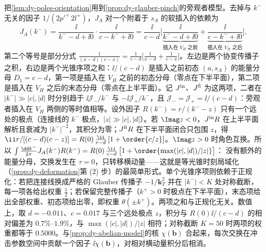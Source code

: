 \begin{example}[旁观者模型的光锥序表示]\label{ex:dy-spectator-lcopt}
把\cref{lem:dy-poles-orientation}用到\cref{prop:dy-glauber-pinch}的旁观者模型。去掉与 $k^-$ 无关的因子 $1/(2p'^+\,2l^+)$，$J_A$ 对一个附着于 $s_A$ 的软插入的依赖为
\begin{equation}\label{eq:dy-JA-two-orderings}
J_A(k^-)=\frac{\ii}{k^--d+\ii0}\cdot\frac{\ii}{c-k^-+\ii0}
=\frac{\ii}{c-d}\Big[\underbrace{\frac{\ii}{k^--d+\ii0}}_{\text{插入在 }V_H\text{ 之前}}+\underbrace{\frac{\ii}{c-k^-+\ii0}}_{\text{插入在 }V_H\text{ 之后}}\Big],
\end{equation}
第二个等号是部分分式 $\frac{1}{(x-d)(c-x)}=\frac{1}{c-d}\big[\frac{1}{x-d}+\frac{1}{c-x}\big]$。左边是两个协变传播子之积，右边是两个光锥序项之和：$\ii/(c-d)$ 是插入之前初态 $(a,s_A)$ 的能量分母 $D_1=c-d$，第一项是插入在 $V_H$ 之前的初态分母（零点在下半平面），第二项是插入在 $V_H$ 之后的末态分母（零点在上半平面）。记 $J^{\rm in}$、$J^{\rm fi}$ 为这两项，二者在 $|k^-|\gg|c|,|d|$ 时分别趋于 $\ii\mathcal J_-/k^-$ 与 $-\ii\mathcal J_+/k^-$，且 $\mathcal J_-=\mathcal J_+=\ii/(c-d)$：旁观者插入在 $V_H$ 两侧的等时值相等。设外因子 $R(k^-)=r/(k^--z)$ 只有一个远处的极点（连接线的 $k^-$ 极点，$|z|\gg|c|,|d|$）。若 $\Imag z<0$，$J^{\rm in}R$ 在上半平面解析且衰减为 $|k^-|^{-2}$，其积分为零；$J^{\rm fi}R$ 在下半平面闭合只包围 $z$，得 $\ii r/[(c-d)(c-z)]=R(0)\,\frac{\ii}{c-d}\,[1+\order{c/z}]$。$\Imag z>0$ 时角色互换。所以
$\int\frac{\dd k^-}{2\pi}J_A(k^-)R(k^-)=R(0)\,\frac{\ii}{c-d}\,\big[1+\order{\max(|c|,|d|)/|z|}\big]$：
没有额外的能量分母，交换发生在 $\tau=0$，只转移横动量——这就是等光锥时刻局域化（\cref{prop:dy-deformation}第 (2) 步）的最简单形式。单个光锥序项则依赖于正规化：若把连接线换成严格的 Glauber 传播子 $-1/\mathbf k_T^2$ 并在 $|k^-|<K$ 处对称截断，每一项各给出权重 $\frac12$；若保留完整传播子（$k^+>0$ 时极点在下半平面），末态项给出全部权重、初态项给出零，即权重 $\theta(\pm k^+)$。两项之和与正规化无关。数值上，取 $d=-0.011$、$c=0.017$ 与三个远处极点 $z$，积分与 $R(0)\ii/(c-d)$ 的相对偏差为 $0.7\%$--$1.9\%$，与 $\max(|c|,|d|)/|z|$ 相符；对称截断 $K=50$ 时两项的权重都等于 $0.5000$。与\cref{prop:dy-abelian-model}的核 $\chi(\boldsymbol b)$ 合起来，每次交换在冲击参数空间中贡献一个因子 $\ii\chi(\boldsymbol b)$，对相对横动量积分后相消。
\end{example}


